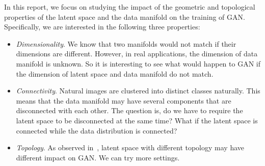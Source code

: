 In this report,
we focus on studying the impact of the geometric and topological
properties of the latent space and the data manifold on the training of GAN.
Specifically,
we are interested in the following three properties:
\begin{itemize}
    \item \emph{Dimensionality}.
        We know that two manifolds would not match
        if their dimensions are different.
        However, in real applications,
        the dimension of data manifold is unknown.
        So it is interesting to see what would happen to GAN if the dimension
        of latent space and data manifold do not match.
    \item \emph{Connectivity}.
        Natural images are clustered into distinct classes naturally.
        This means that the data manifold may have several components
        that are disconnected with each other.
        The question is,
        do we have to require the latent space to be disconnected
        at the same time?
        What if the latent space is connected while the data distribution
        is connected?
    \item \emph{Topology}.
        As observed in~\cite{white2016sampling},
        latent space with different topology may have different impact on GAN.
        We can try more settings.
\end{itemize}
